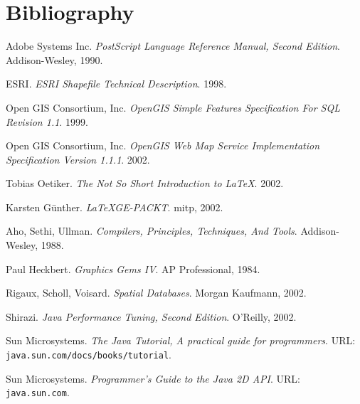 
\section{Bibliography}

\begin{thebibliography}{99}

Adobe Systems Inc. \emph{PostScript Language Reference Manual, Second
Edition}.  Addison-Wesley, 1990.

ESRI. \emph{ESRI Shapefile Technical Description}. 1998.

Open GIS Consortium, Inc. \emph{OpenGIS Simple Features Specification
For SQL Revision 1.1}.  1999.

Open GIS Consortium, Inc. \emph{OpenGIS Web Map Service Implementation
Specification Version 1.1.1}.  2002.

Tobias Oetiker. \emph{The Not So Short Introduction to
\LaTeX}.  2002.

Karsten G\"unther. \emph{\LaTeX GE-PACKT}. mitp, 2002.

Aho, Sethi, Ullman. \emph{Compilers, Principles, Techniques, And Tools}.
Addison-Wesley, 1988.

Paul Heckbert. \emph{Graphics Gems IV}.
AP Professional, 1984.

Rigaux, Scholl, Voisard. \emph{Spatial Databases}.
Morgan Kaufmann, 2002.

Shirazi. \emph{Java Performance Tuning, Second Edition}.
O'Reilly, 2002.

Sun Microsystems. \emph{The Java Tutorial, A practical guide for programmers}.
URL: \texttt{java.sun.com/docs/books/tutorial}.

Sun Microsystems. \emph{Programmer's Guide to the Java 2D API}.
URL: \texttt{java.sun.com}.

\end{thebibliography}

